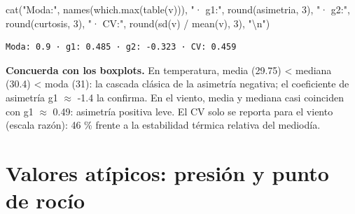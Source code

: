 \documentclass[oneside, openany, fontset=libertinus]{mitthesis}
\newenvironment{Shaded}{\begin{snugshade}}{\end{snugshade}}
\newcommand{\AttributeTok}[1]{\textcolor[rgb]{0.40,0.45,0.13}{#1}}
\newcommand{\ConstantTok}[1]{\textcolor[rgb]{0.56,0.35,0.01}{#1}}
\newcommand{\DecValTok}[1]{\textcolor[rgb]{0.68,0.00,0.00}{#1}}
\newcommand{\FloatTok}[1]{\textcolor[rgb]{0.68,0.00,0.00}{#1}}
\newcommand{\FunctionTok}[1]{\textcolor[rgb]{0.28,0.35,0.67}{#1}}
\newcommand{\NormalTok}[1]{\textcolor[rgb]{0.00,0.23,0.31}{#1}}
\newcommand{\OtherTok}[1]{\textcolor[rgb]{0.00,0.23,0.31}{#1}}
\newcommand{\SpecialCharTok}[1]{\textcolor[rgb]{0.37,0.37,0.37}{#1}}
\newcommand{\StringTok}[1]{\textcolor[rgb]{0.13,0.47,0.30}{#1}}
\begin{document}
\begin{Shaded}
\begin{Highlighting}[]
\FunctionTok{cat}\NormalTok{(}\StringTok{"Moda:"}\NormalTok{, }\FunctionTok{names}\NormalTok{(}\FunctionTok{which.max}\NormalTok{(}\FunctionTok{table}\NormalTok{(v))), }\StringTok{"· g1:"}\NormalTok{, }\FunctionTok{round}\NormalTok{(asimetria, }\DecValTok{3}\NormalTok{),}
    \StringTok{"· g2:"}\NormalTok{, }\FunctionTok{round}\NormalTok{(curtosis, }\DecValTok{3}\NormalTok{), }\StringTok{"· CV:"}\NormalTok{, }\FunctionTok{round}\NormalTok{(}\FunctionTok{sd}\NormalTok{(v) }\SpecialCharTok{/} \FunctionTok{mean}\NormalTok{(v), }\DecValTok{3}\NormalTok{), }\StringTok{"}\SpecialCharTok{\textbackslash{}n}\StringTok{"}\NormalTok{)}
\end{Highlighting}
\end{Shaded}

\begin{verbatim}
Moda: 0.9 · g1: 0.485 · g2: -0.323 · CV: 0.459 
\end{verbatim}

\textbf{Concuerda con los boxplots.} En temperatura, media (29.75)
\textless{} mediana (30.4) \textless{} moda (31): la cascada clásica de
la asimetría negativa; el coeficiente de asimetría g1 \(\approx\) -1.4
la confirma. En el viento, media y mediana casi coinciden con g1
\(\approx\) 0.49: asimetría positiva leve. El CV solo se reporta para el
viento (escala razón): 46 \% frente a la estabilidad térmica relativa
del mediodía.

\chapter{Valores atípicos: presión y punto de rocío}\label{p6}

\begin{Shaded}
\end{Shaded}
\end{document}
